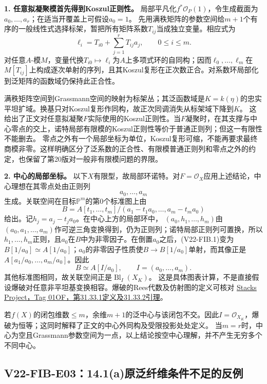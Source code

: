 \documentclass[UTF8,a4paper]{ctexbook}
\begin{document}
\noindent\textbf{1. 任意拟凝聚模首先得到Koszul正则性。}
局部平凡化$f^*\mathcal O_P(1)$，令生成截面为$a_0,\ldots,a_r$；在适当开覆盖上可假设$a_0=1$。
先用满秩矩阵的参数空间给$m+1$个有序的一般线性式选择标架，暂把所有矩阵系数$T_{ij}$当成独立变量。相应式为
\[
\ell_i=T_{i0}+\sum_{j=1}^rT_{ij}a_j,\qquad 0\leq i\leq m.
\]
对任意$A$-模$M$，变量代换$T_{i0}\mapsto\ell_i$为$A$上多项式环的自同构；因而$\ell_0,\ldots,\ell_m$在$M[T_{ij}]$上构成逐次单射的序列，且其Koszul复形在正次数正合。对系数环局部化到泛矩阵的函数域仍保持此正合性。

满秩矩阵空间到Grassmann空间的映射为标架丛；其泛函数域是$K=k(\eta)$的忠实平坦扩域。换基只对Koszul复形作同构，故正次同调消失从标架域下降到$K$。
这给出了正文对任意拟凝聚$F$实际使用的Koszul正则性。当$F$凝聚时，在其支撑与中心零点的交上，诺特局部有限模的Koszul正则性等价于普通正则列；但这一有限性不能删去。
零点之外有一个局部坐标为单位，Koszul复形可缩，不能再要求最终商模非零。这样明确区分了泛系数的正合性、有限模普通正则列和零点之外的约定，也保留了第20版对一般非有限模问题的界限。

\noindent\textbf{2. 中心的局部坐标。}
以下$X$有限型，故局部环诺特。对$F=\mathcal O_X$应用上述结论，中心理想在其零点处由正则列
\[
a_0,\ldots,a_m
\]
生成。关联空间在目标$\mathbb P^m$的第0个标准图上由
\[
B=A[t_1,\ldots,t_m]/(a_1-t_1a_0,\ldots,a_m-t_ma_0)
\tag{V22-FIB.1}
\]
给出。记$h_j=a_j-t_ja_0$。在中心上方的局部环中，
$(a_0,h_1,\ldots,h_m)$由$(a_0,a_1,\ldots,a_m)$作可逆三角变换得到，仍为正则列；诺特局部正则列可置换，所以$h_1,\ldots,h_m$正则，且$a_0$在$B$中为非零因子。在倒置$a_0$之后，(V22-FIB.1)变为$B[1/a_0]\simeq A[1/a_0]$；$a_0$的非零因子性质使$B\to B[1/a_0]$单射，而其像正是$A[a_1/a_0,\ldots,a_m/a_0]$。因此
\[
B\simeq A[I/a_0],\qquad I=(a_0,\ldots,a_m).
\]
其他标准图相同，故关联空间正是$\operatorname{Bl}_I(X_K)$。
这是具体图表计算，不是直接假设爆破对任意非平坦基变换相容。爆破的Rees代数及仿射图的定义可核对
\href{https://stacks.math.columbia.edu/tag/01OF}{Stacks Project，Tag 01OF，第31.33.1定义及31.33.2引理}。

若$f(X)$的闭包维数$\leq m$，余维$m+1$的泛中心与该闭包不交。因此$I=\mathcal O_{X_K}$，爆破为恒等；这同时解释了正文的中心外同构及受限投影处处定义。
当$m=r$时，中心为空且Grassmann参数空间为一点，以上结论按空中心理解，并不产生无穷多个不同中心。

\subsection*{V22-FIB-E03：14.1(a)原泛纤维条件不足的反例}
\end{document}
